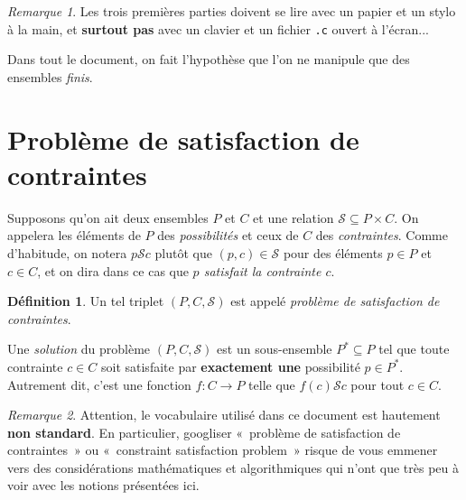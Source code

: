 \documentclass[french,a4paper]{article}
\theoremstyle{definition}
\newtheorem*{definition}{Définition}
\theoremstyle{remark}
\newtheorem*{remark}{Remarque}
\newcommand{\shell}[1]{\lstinline[style={},style=sh]|#1|}
\begin{document}
\begin{remark}
  Les trois premières parties doivent se lire avec un papier et un
  stylo à la main, et {\bf surtout pas} avec un clavier et un fichier
  \shell{.c} ouvert à l'écran...
\end{remark}

\medskip

Dans tout le document, on fait l'hypothèse que l'on ne manipule que
des ensembles {\em finis}.

\section{Problème de satisfaction de contraintes}
\label{sec:exact-hit}

Supposons qu'on ait deux ensembles $P$ et $C$ et une relation
$\mathcal S \subseteq P \times C$. On appelera les éléments de $P$ des
{\em possibilités} et ceux de $C$ des {\em contraintes}. Comme
d'habitude, on notera $p \mathrel{\mathcal S} c$ plutôt que
$(p,c) \in \mathcal S$ pour des éléments $p\in P$ et $c\in C$, et on
dira dans ce cas que {\em $p$ satisfait la contrainte $c$}.

\begin{definition}
  Un tel triplet $(P,C,\mathcal S)$ est appelé {\em problème de
    satisfaction de contraintes}.

  Une {\em solution} du problème $(P,C,\mathcal S)$ est un
  sous-ensemble $P^\ast \subseteq P$ tel que toute contrainte
  $c \in C$ soit satisfaite par {\bf exactement une} possibilité
  $p \in P^\ast$. Autrement dit, c'est une fonction $f : C \to P$
  telle que $f(c) \mathrel{\mathcal S} c$ pour tout $c \in C$.
\end{definition}

\begin{remark}
  Attention, le vocabulaire utilisé dans ce document est hautement
  {\bf non standard}. En particulier, googliser «~problème de
  satisfaction de contraintes~» ou «~constraint satisfaction problem~»
  risque de vous emmener vers des considérations mathématiques et
  algorithmiques qui n'ont que très peu à voir avec les notions
  présentées ici.
\end{remark}
\end{document}
